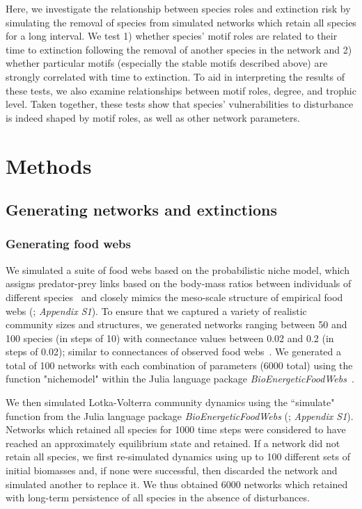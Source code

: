 \documentclass[12pt]{article}
\begin{document}
\begin{spacing}{2.0}
    
    Here, we investigate the relationship between species roles and extinction risk by simulating the removal of species from simulated networks which retain all species for a long interval. 
    We test 1) whether species' motif roles are related to their time to extinction following the removal of another species in the network and 2) whether particular motifs (especially the stable motifs described above) are strongly correlated with time to extinction.
    To aid in interpreting the results of these tests, we also examine relationships between motif roles, degree, and trophic level.
    Taken together, these tests show that species' vulnerabilities to disturbance  is indeed shaped by motif roles, as well as other network parameters.


\section*{Methods}

    \subsection*{Generating networks and extinctions}

    	\subsubsection*{Generating food webs}
    
            We simulated a suite of food webs based on the probabilistic niche model, which assigns predator-prey links based on the body-mass ratios between individuals of different species~\citep{Williams2000,Delmas2017} and closely mimics the meso-scale structure of empirical food webs (\citealp{Stouffer2007}; \emph{Appendix S1}).
            To ensure that we captured a variety of realistic community sizes and structures, we generated networks ranging between 50 and 100 species (in steps of 10) with connectance values between 0.02 and 0.2 (in steps of 0.02); similar to connectances of observed food webs~\citep{Dunne2002e}. 
            We generated a total of 100 networks with each combination of parameters (6000 total) using the function "nichemodel" within the Julia language package \emph{BioEnergeticFoodWebs}~\citep{bioenergeticfw,Delmas2017}.


            We then simulated Lotka-Volterra community dynamics using the ``simulate" function from the Julia language package \emph{BioEnergeticFoodWebs} (\citealp{bioenergeticfw,Delmas2017}; \emph{Appendix S1}).
            Networks which retained all species for 1000 time steps were considered to have reached an approximately  equilibrium state and retained.
            If a network did not retain all species, we first re-simulated dynamics using up to 100 different sets of initial biomasses and, if none were successful, then discarded the network and simulated another to replace it.
            We thus obtained 6000 networks which retained with long-term persistence of all species in the absence of disturbances.


\end{spacing}
\end{document}
